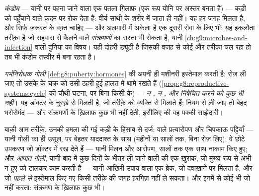 \begin{definition}[रोक वाले तरीक़े: कंडोम]\label{def:g8:contraception:condom}
\emph{कंडोम} --- यानी  पर पहना जाने वाला एक पतला ग़िलाफ़
(एक  रूप योनि पर अस्तर बनता है) --- कड़ी को पहुँचाने वाले क़दम पर
रोक देता है: वीर्य साथी के शरीर में जाता ही नहीं। यह हर जगह मिलता है,
और सिर्फ़ ज़रूरत के वक़्त चाहिए --- और अलमारी में अकेला है एक दूसरी सेवा
के लिए भी: यह इकलौता तरीक़ा है जो सहवास से फैलने वाले \emph{संक्रमणों}
का रास्ता भी रोकता है, यानी \cref{ch:g9:microbes-and-infection} वाली
दुनिया का विषय। यही दोहरी ड्यूटी है जिसकी वजह से कोई और तरीक़ा चल रहा हो
तब भी कंडोम तस्वीर में बना रहता है।
\end{definition}

\begin{definition}[हॉर्मोन वाले तरीक़े: गोली]\label{def:g8:contraception:pill}
\emph{गर्भनिरोधक गोली}
\cref{def:g8:puberty:hormones} की अपनी ही मशीनरी इस्तेमाल करती है: रोज़
ली जाए तो उसके   के चक्र को उसी ठहरी हुई हालत में थामे
रखते हैं (\cref{prop:g8:reproductive-systems:cycle} की चौथी घटना, पर
बिना किसी  के) --- \emph{न , न , और निषेचित
करने को कुछ भी नहीं}। यह डॉक्टर के नुस्ख़े से मिलती है, जो तरीक़े को
व्यक्ति से मिलाते हैं; नियम से ली जाए तो बेहद भरोसेमंद --- और संक्रमणों
के ख़िलाफ़ कुछ भी नहीं देती, इसीलिए  की वह पक्की साझेदारी।
\end{definition}

\begin{example}[अलमारी, कड़ी के हिसाब से छँटी हुई]\label{ex:g8:contraception:shelf}
बाक़ी आम तरीक़े, उनकी हमला की गई कड़ी के हिसाब से दर्ज:  वाले
प्रत्यारोपण और चिपकाऊ पट्टियाँ --- यानी गोली का ही उसूल, पर बेहतर
याददाश्त के साथ (महीनों या सालों तक, बिना रोज़ लिए); वे छोटे उपकरण जो
डॉक्टर  में रख देते हैं --- यानी मिलन और आरोपण, सालों तक एक साथ
नाकाम किए हुए; और \emph{आपात गोली}, यानी बाद में कुछ दिनों के भीतर ली
जाने वाली  की एक ख़ुराक, जो मुख्य रूप से अभी न हुए  को
टालकर काम करती है --- यानी आख़िरी उपाय वाला एक ब्रेक, जो दवाख़ाने पर
मिलता है, और जो \emph{पहले से} इस्तेमाल किए गए किसी तरीक़े की जगह हरगिज़
नहीं ले सकता। और इनमें से कोई भी जो नहीं करता: संक्रमण के ख़िलाफ़ कुछ
भी।
\end{example}

